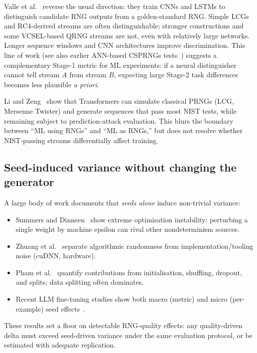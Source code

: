 Valle et al.~\cite{valle2024assessing} reverse the usual direction: they train CNNs and LSTMs to distinguish candidate RNG outputs from a golden-standard RNG.
Simple LCGs and RC4-derived streams are often distinguishable; stronger constructions and some VCSEL-based QRNG streams are not, even with relatively large networks.
Longer sequence windows and CNN architectures improve discrimination.
This line of work (see also earlier ANN-based CSPRNGs tests~\cite{schindler2018testing}) suggests a complementary Stage-1 metric for ML experiments: if a neural distinguisher cannot tell stream $A$ from stream $B$, expecting large Stage-2 task differences becomes less plausible \emph{a priori}.

Li and Zeng~\cite{li2026transformers} show that Transformers can simulate classical PRNGs (LCG, Mersenne Twister) and generate sequences that pass most NIST tests, while remaining subject to prediction-attack evaluation.
This blurs the boundary between ``ML using RNGs'' and ``ML as RNGs,'' but does not resolve whether NIST-passing streams differentially affect training.

\subsection{Seed-induced variance without changing the generator}

A large body of work documents that \emph{seeds alone} induce non-trivial variance:
\begin{itemize}[leftmargin=*]
  \item Summers and Dinneen~\cite{summers2021nondeterminism} show extreme optimisation instability: perturbing a single weight by machine epsilon can rival other nondeterminism sources.
  \item Zhuang et al.~\cite{zhuang2022randomness} separate algorithmic randomness from implementation/tooling noise (cuDNN, hardware).
  \item Pham et al.~\cite{pham2022quantifying} quantify contributions from initialisation, shuffling, dropout, and splits; data splitting often dominates.
  \item Recent LLM fine-tuning studies show both macro (metric) and micro (per-example) seed effects~\cite{li2025macroseeds}.
\end{itemize}
These results set a floor on detectable RNG-quality effects: any quality-driven delta must exceed seed-driven variance under the same evaluation protocol, or be estimated with adequate replication.

